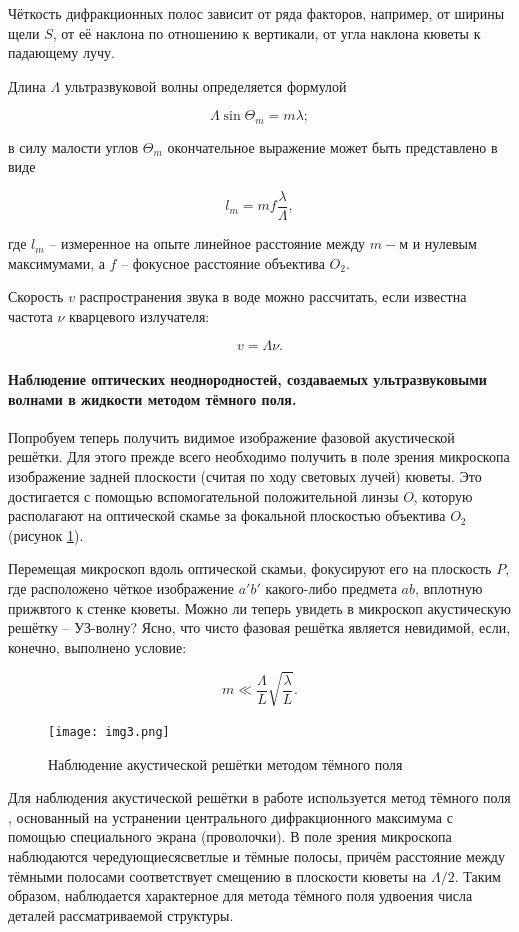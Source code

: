 \documentclass[a4paper,12pt]{article} %
\begin{document}
Чёткость дифракционных полос зависит от ряда факторов, например, от ширины щели $S$, от её наклона по отношению к вертикали, от угла наклона кюветы к падающему лучу.

Длина $\Lambda$ ультразвуковой волны определяется формулой

\[ \Lambda\sin{\Theta_{m}}=m\lambda; \]

в силу малости углов $\Theta_{m}$ окончательное выражение может быть представлено в виде

\[ l_{m}=mf\frac{\lambda}{\Lambda}, \]

где $l_{m}$ -- измеренное на опыте линейное расстояние между $m-$м и нулевым максимумами, а $f$ -- фокусное расстояние объектива $O_2$.

Скорость $v$ распространения звука в воде можно рассчитать, если известна частота $\nu$ кварцевого излучателя:

\[ v=\Lambda\nu. \]

\paragraph{Наблюдение оптических неоднородностей, создаваемых ультразвуковыми волнами в жидкости методом тёмного поля.} Попробуем теперь получить видимое изображение фазовой акустической решётки. Для этого прежде всего необходимо получить в поле зрения микроскопа изображение задней плоскости (считая по ходу световых лучей) кюветы. Это достигается с помощью вспомогательной положительной линзы $O$, которую располагают на оптической скамье за фокальной плоскостью объектива $O_2$ (рисунок \ref{img3}).

Перемещая микроскоп вдоль оптической скамьи, фокусируют его на плоскость $P$, где расположено чёткое изображение $a'b'$ какого-либо предмета $ab$, вплотную прижвтого к стенке кюветы. Можно ли теперь увидеть в микроскоп акустическую решётку -- УЗ-волну? Ясно, что чисто фазовая решётка является невидимой, если, конечно, выполнено условие:

\[ m \ll \frac{\Lambda}{L}\sqrt{\frac{\lambda}{L}}. \]

\begin{figure}[h]
    \begin{center}
        \texttt{[image: img3.png]}
    \end{center}
    \caption{Наблюдение акустической решётки методом тёмного поля}
    \label{img3}
\end{figure}

Для наблюдения акустической решётки в работе используется $\text{метод тёмного поля}$, основанный на устранении центрального дифракционного максимума с помощью специального экрана (проволочки). В поле зрения микроскопа наблюдаются чередующиесясветлые и тёмные полосы, причём расстояние между тёмными полосами соответствует смещению в плоскости кюветы на $\Lambda/2$. Таким образом, наблюдается характерное для метода тёмного поля удвоения числа деталей рассматриваемой структуры.
\end{document}
